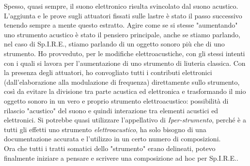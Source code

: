 Spesso, quasi sempre, il suono elettronico risulta svincolato dal suono acustico. L'aggiunta e le prove sugli attuatori fissati sulle lastre è stato il passo successivo tenendo sempre a mente questo estratto. Agire come se si stesse "aumentando" uno strumento acustico è stato il pensiero principale, anche se stiamo parlando, nel caso di Sp.I.R.E., stiamo parlando di un oggetto sonoro più che di uno strumento. Ho provveduto, per le modifiche elettroacustiche, con gli stessi intenti con i quali si lavora per l'aumentazione di uno strumento di liuteria classica. Con la presenza degli attuatori, ho convogliato tutti i contributi elettronici (dall'elaborazione alla modulazione di frequenza) direttamente sullo strumento, così da evitare la divisione tra parte acustica ed elettronica e trasformando il mio oggetto sonoro in un vero e proprio strumento elettroacustico: possibilità di rilascio "acustico" del suono e quindi interazione tra elementi acustici ed elettronici. Si potrebbe quasi utilizzare l'appellativo di \textit{Iper-strumento}, perché è a tutti gli effetti uno strumento \textit{elettroacustico}, ha solo bisogno di una documentazione accurata e l'utilizzo in un certo numero di composizioni. \\
Ora che tutti i tratti somatici dello "strumento" erano delineati, potevo finalmente iniziare a pensare e scrivere una composizione ad hoc per Sp.I.R.E..

